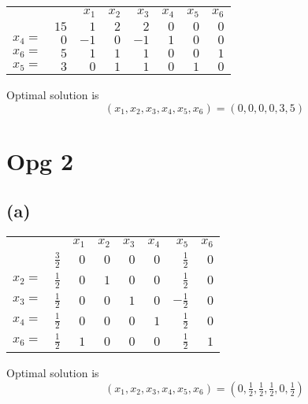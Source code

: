 \documentclass{article}
\theoremstyle{definition}
\begin{document}
\egroup
\bgroup
\def\arraystretch{1.5}
\begin{table}[H]
  \begin{tabular}{r|r|rrrrrr|}
  \cline{2-8}
    &   & $x_1$ & $x_2$ & $x_3$ & $x_4$ & $x_5$ & $x_6$ \\ \cline{2-8}
    & $15$ & $1$ & $2$ & $2$ & $0$ & $0$ & $0$ \\ \cline{2-8}
  $x_4 = $ & $0$ & $-1$ & $0$ & $-1$ & $1$ & $0$ & $0$ \\ 
  $x_6 = $ & $5$ & $1$ & $1$ & $1$ & $0$ & $0$ & $1$ \\ 
  $x_5 = $ & $3$ & $0$ & $1$ & $1$ & $0$ & $1$ & $0$ \\ \cline{2-8}
  \end{tabular}
\end{table}
\egroup
Optimal solution is
\[
  (x_1, x_2, x_3, x_4, x_5, x_6) = (0, 0, 0, 0, 3, 5)
\]

\section*{Opg 2}
\subsection*{(a)}
\bgroup
\def\arraystretch{1.5}
\begin{table}[H]
  \begin{tabular}{r|r|rrrrrr|}
  \cline{2-8}
    &   & $x_1$ & $x_2$ & $x_3$ & $x_4$ & $x_5$ & $x_6$ \\ \cline{2-8}
    & $\tfrac{3}{2}$ & $0$ & $0$ & $0$ & $0$ & $\tfrac{1}{2}$ & $0$ \\ \cline{2-8}
  $x_2 = $ & $\tfrac{1}{2}$ & $0$ & $1$ & $0$ & $0$ & $\tfrac{1}{2}$ & $0$ \\ 
  $x_3 = $ & $\tfrac{1}{2}$ & $0$ & $0$ & $1$ & $0$ & $-\tfrac{1}{2}$ & $0$ \\ 
  $x_4 = $ & $\tfrac{1}{2}$ & $0$ & $0$ & $0$ & $1$ & $\tfrac{1}{2}$ & $0$ \\ 
  $x_6 = $ & $\tfrac{1}{2}$ & $1$ & $0$ & $0$ & $0$ & $\tfrac{1}{2}$ & $1$ \\ \cline{2-8}
  \end{tabular}
\end{table}
\egroup
Optimal solution is
\[
  (x_1, x_2, x_3, x_4, x_5, x_6) = (0, \tfrac{1}{2}, \tfrac{1}{2}, \tfrac{1}{2}, 0, \tfrac{1}{2})
\]
\end{document}

